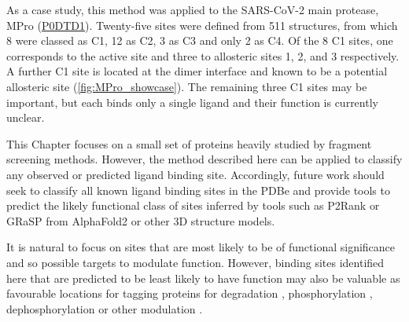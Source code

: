{As a case study, this method was applied to the SARS-CoV-2 main protease, MPro (\href{https://www.uniprot.org/uniprotkb/P0DTD1/entry}{P0DTD1}). Twenty-five sites were defined from 511 structures, from which 8 were classed as C1, 12 as C2, 3 as C3 and only 2 as C4. Of the 8 C1 sites, one corresponds to the active site and three to allosteric sites 1, 2, and 3 \cite{DASGUPTA_2022_ALLOSTERIC} respectively. A further C1 site is located at the dimer interface and known to be a potential allosteric site \cite{DOUANGAMATH_2020_SARSCOV2} (\autoref{fig:MPro_showcase}). The remaining three C1 sites may be important, but each binds only a single ligand and their function is currently unclear.

This Chapter focuses on a small set of proteins heavily studied by fragment screening methods. However, the method described here can be applied to classify any observed or predicted ligand binding site. Accordingly, future work should seek to classify all known ligand binding sites in the PDBe and provide tools to predict the likely functional class of sites inferred by tools such as P2Rank \cite{KRIVAK_2018_P2RANK} or GRaSP \cite{SANTANA_2020_GRaSP, SANTANA_2022_GRaSP} from AlphaFold2 \cite{JUMPER_2021_ALPHAFOLD, VARADI_2022_ALPHAFOLDDB} or other 3D structure models.

It is natural to focus on sites that are most likely to be of functional significance and so possible targets to modulate function. However, binding sites identified here that are predicted to be least likely to have function may also be valuable as favourable locations for tagging proteins for degradation \cite{BEKES_2022_PROTACS}, phosphorylation \cite{SIRIWARDENA_2020_PHOSPHO}, dephosphorylation \cite{SIMPSON_2023_ADPROM} or other modulation \cite{HEITEL_2023_PTMS, PENG_2023_PTMS}.

}
